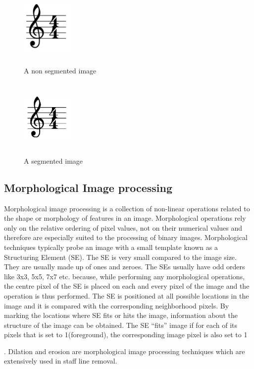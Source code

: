 \documentclass[journal]{IEEEtran}
\begin{document}
\begin{figure}
\includegraphics[width=1in,height=1.5in,clip,keepaspectratio]{resources/implementation/non_segmented_image}
\centering
\caption{A non segmented image}
\end{figure}

\begin{figure}
\includegraphics[width=1.0in,height=1.5in,clip,keepaspectratio]{resources/implementation/segmented_image}
\centering
\caption{A segmented image}
\end{figure}

\subsection{Morphological Image processing}
Morphological image processing is a collection of non-linear operations related to the shape or morphology of features in an image. Morphological operations rely only on the relative ordering of
pixel values, not on their numerical values and therefore are especially suited to the processing of binary images. Morphological techniques typically probe an image with a small template known as a Structuring Element (SE). The SE is very small compared to the image size. They are usually made up of
ones and zeroes. The SEs usually have odd orders like 3x3, 5x5, 7x7 etc. because, while performing any morphological operations, the centre pixel of the SE is placed on each and every pixel of the
image and the operation is thus performed. The SE is positioned at all possible locations in the image and it is compared with the corresponding neighborhood pixels. By marking the locations
where SE fits or hits the image, information about the structure of the image can be obtained. The SE ``fits” image if for each of its pixels that is set to 1(foreground), the corresponding image pixel
is also set to 1 \par. Dilation and erosion are morphological image processing techniques which are extensively used in staff line removal.
\end{document}
